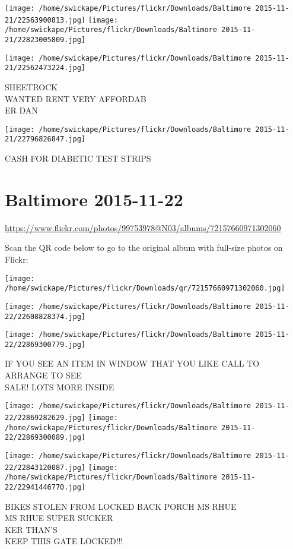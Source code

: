 \documentclass[10pt,letterpaper]{article}
\begin{document}
\texttt{[image: /home/swickape/Pictures/flickr/Downloads/Baltimore 2015-11-21/22563900813.jpg]}
\texttt{[image: /home/swickape/Pictures/flickr/Downloads/Baltimore 2015-11-21/22823005809.jpg]}

\texttt{[image: /home/swickape/Pictures/flickr/Downloads/Baltimore 2015-11-21/22562473224.jpg]}

SHEETROCK\\
WANTED RENT VERY AFFORDAB\\
ER DAN
\pagebreak

\texttt{[image: /home/swickape/Pictures/flickr/Downloads/Baltimore 2015-11-21/22796826847.jpg]}

CASH FOR DIABETIC TEST STRIPS
\pagebreak

\section*{Baltimore 2015-11-22}

\url{https://www.flickr.com/photos/99753978@N03/albums/72157660971302060}

Scan the QR code below to go to the original album with full-size photos on Flickr:

\texttt{[image: /home/swickape/Pictures/flickr/Downloads/qr/72157660971302060.jpg]}
\pagebreak

\texttt{[image: /home/swickape/Pictures/flickr/Downloads/Baltimore 2015-11-22/22608828374.jpg]}

\vspace{0.25in}
\texttt{[image: /home/swickape/Pictures/flickr/Downloads/Baltimore 2015-11-22/22869300779.jpg]}

IF YOU SEE AN ITEM IN WINDOW THAT YOU LIKE CALL TO ARRANGE TO SEE\\
SALE!  LOTS MORE INSIDE
\pagebreak

\texttt{[image: /home/swickape/Pictures/flickr/Downloads/Baltimore 2015-11-22/22869282629.jpg]}
\texttt{[image: /home/swickape/Pictures/flickr/Downloads/Baltimore 2015-11-22/22869300089.jpg]}

\texttt{[image: /home/swickape/Pictures/flickr/Downloads/Baltimore 2015-11-22/22843120087.jpg]}
\texttt{[image: /home/swickape/Pictures/flickr/Downloads/Baltimore 2015-11-22/22941446770.jpg]}

BIKES STOLEN FROM LOCKED BACK PORCH MS RHUE\\
MS RHUE SUPER SUCKER\\
KER THAN'S\\
KEEP THIS GATE LOCKED!!!
\pagebreak
\end{document}
